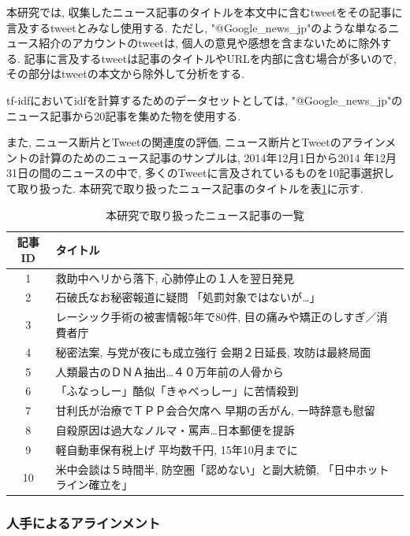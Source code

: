 \documentclass[12pt]{jarticle}
\begin{document}
本研究では, 収集したニュース記事のタイトルを本文中に含むtweetをその記事に言及するtweetとみなし使用する. ただし, "@Google\_news\_jp"のような単なるニュース紹介のアカウントのtweetは, 個人の意見や感想を含まないために除外する. 記事に言及するtweetは記事のタイトルやURLを内部に含む場合が多いので, その部分はtweetの本文から除外して分析をする. 

tf-idfにおいてidfを計算するためのデータセットとしては, "@Google\_news\_jp"のニュース記事から20記事を集めた物を使用する. 

また, ニュース断片とTweetの関連度の評価, ニュース断片とTweetのアラインメントの計算のためのニュース記事のサンプルは, 2014年12月1日から2014
年12月31日の間のニュースの中で, 多くのTweetに言及されているものを10記事選択して取り扱った. 本研究で取り扱ったニュース記事のタイトルを表\ref{news_table}に示す. 

\begin{table}
\begin{center}
\caption{本研究で取り扱ったニュース記事の一覧}
\label{news_table}
\begin{tabular}[t]{|c||l|}
  \hline
  記事ID & タイトル \\
  \hline
  \hline
1 & 救助中ヘリから落下, 心肺停止の１人を翌日発見 \\ \hline
2 & 石破氏なお秘密報道に疑問 「処罰対象ではないが…」 \\ \hline
3 & レーシック手術の被害情報5年で80件, 目の痛みや矯正のしすぎ／消費者庁 \\ \hline
4 & 秘密法案, 与党が夜にも成立強行 会期２日延長, 攻防は最終局面 \\ \hline
5 & 人類最古のＤＮＡ抽出…４０万年前の人骨から \\ \hline
6 & 「ふなっしー」酷似「きゃべっしー」に苦情殺到 \\ \hline
7 & 甘利氏が治療でＴＰＰ会合欠席へ 早期の舌がん, 一時辞意も慰留 \\ \hline
8 & 自殺原因は過大なノルマ・罵声…日本郵便を提訴 \\ \hline
9 & 軽自動車保有税上げ 平均数千円, 15年10月までに \\ \hline
10 & 米中会談は５時間半, 防空圏「認めない」と副大統領, 「日中ホットライン確立を」 \\ \hline
\end{tabular}
\end{center}
\end{table}

\subsubsection{人手によるアラインメント}
\label{align_by_human}
\end{document}
